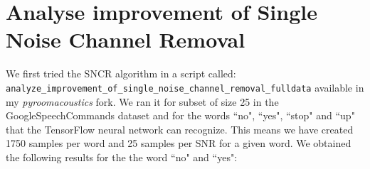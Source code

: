 \documentclass[11pt,a4paper,titlepage]{report}
\begin{document}
\section{Analyse improvement of Single Noise Channel Removal}
\hspace*{0.6cm}
We first tried the SNCR algorithm in a script called:\\ \texttt{analyze\_improvement\_of\_single\_noise\_channel\_removal\_fulldata} available in my \textit{pyroomacoustics} fork. We ran it for subset of size 25 in the GoogleSpeechCommands dataset and for the words ``no", ``yes", ``stop" and ``up"  that the TensorFlow neural network can recognize. This means we have created 1750 samples per word and 25 samples per SNR for a given word. We obtained the following results for the the word ``no" and ``yes":\\
\end{document}

